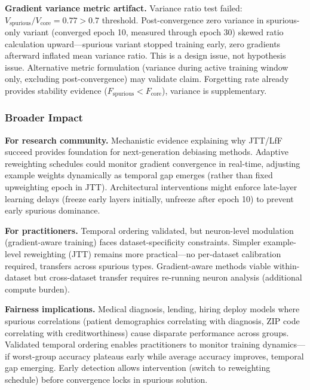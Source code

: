 \textbf{Gradient variance metric artifact.} Variance ratio test failed: $V_{\text{spurious}} / V_{\text{core}} = 0.77 > 0.7$ threshold. Post-convergence zero variance in spurious-only variant (converged epoch 10, measured through epoch 30) skewed ratio calculation upward---spurious variant stopped training early, zero gradients afterward inflated mean variance ratio. This is a design issue, not hypothesis issue. Alternative metric formulation (variance during active training window only, excluding post-convergence) may validate claim. Forgetting rate already provides stability evidence ($F_{\text{spurious}} < F_{\text{core}}$), variance is supplementary.

\subsubsection{Broader Impact}

\textbf{For research community.} Mechanistic evidence explaining why JTT/LfF succeed provides foundation for next-generation debiasing methods. Adaptive reweighting schedules could monitor gradient convergence in real-time, adjusting example weights dynamically as temporal gap emerges (rather than fixed upweighting epoch in JTT). Architectural interventions might enforce late-layer learning delays (freeze early layers initially, unfreeze after epoch 10) to prevent early spurious dominance.

\textbf{For practitioners.} Temporal ordering validated, but neuron-level modulation (gradient-aware training) faces dataset-specificity constraints. Simpler example-level reweighting (JTT) remains more practical---no per-dataset calibration required, transfers across spurious types. Gradient-aware methods viable within-dataset but cross-dataset transfer requires re-running neuron analysis (additional compute burden).

\textbf{Fairness implications.} Medical diagnosis, lending, hiring deploy models where spurious correlations (patient demographics correlating with diagnosis, ZIP code correlating with creditworthiness) cause disparate performance across groups. Validated temporal ordering enables practitioners to monitor training dynamics---if worst-group accuracy plateaus early while average accuracy improves, temporal gap emerging. Early detection allows intervention (switch to reweighting schedule) before convergence locks in spurious solution.
